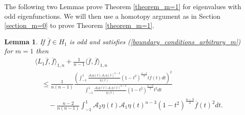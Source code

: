 \documentclass[12pt,twoside]{amsart}
\numberwithin{satz}{section}
\newtheorem{lemma}[satz]{Lemma}
\theoremstyle{definition}
\numberwithin{equation}{section}
\begin{document}
	The following two Lemmas prove Theorem \ref{theorem_m=1} for eigenvalues with odd eigenfunctions. We will then use a homotopy argument as in Section \ref{section_m=0} to prove Theorem \ref{theorem_m=1}.
	
	\begin{lemma}\label{odd_case}
		If $\overline{f} \in H_1$ is odd and satisfies (\ref{boundary_conditions_arbitrary_m}) for $m=1$ then
		\begin{align}\label{ineq_odd_case}
			& \langle L_1\overline{f},\overline{f}\rangle_{1,n} + \frac{1}{n-1}\langle \overline{f},\overline{f}\rangle_{1,n} \nonumber \\
			& \quad \leq \frac{1}{n(n-1)}\frac{\left(\int_{-1}^1\frac{\mathcal{A}_2\eta(t)\mathcal{A}_1\eta(t)^{n-2}}{\eta(t)}(1-t^2)^{\frac{n-2}{2}}t\overline{f}(t)dt\right)^2}{\int_{-1}^1\frac{\mathcal{A}_2\eta(t)\mathcal{A}_1\eta(t)^{n-2}}{\eta(t)}(1-t^2)^{\frac{n-3}{2}}t^2dt} \\
			& \quad \quad  -\frac{n-2}{n(n-1)} \int_{-1}^1 \mathcal{A}_2\eta(t)\mathcal{A}_1\eta(t)^{n-3} (1-t^2)^{\frac{n-3}{2}} \overline{f}(t)^2dt. \nonumber
		\end{align}
	\end{lemma}
	
\end{document}
